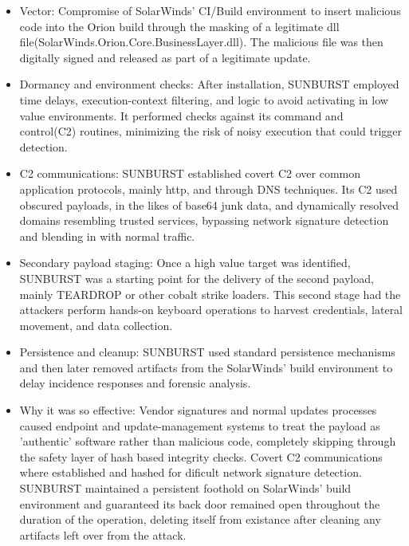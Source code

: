 \documentclass[conference]{IEEEtran}
\begin{document}
\begin{itemize}
    \item Vector: Compromise of SolarWinds' CI/Build environment to insert malicious code into the Orion build through the masking of a legitimate dll file(SolarWinds.Orion.Core.BusinessLayer.dll).
    The malicious file was then digitally signed and released as part of a legitimate update.\cite{MicrosoftDeepDiveSOLORIGATE}\\
    \item Dormancy and environment checks: After installation, SUNBURST employed time delays, execution-context filtering, and logic to avoid activating in low value environments.
    It performed checks against its command and control(C2) routines, minimizing the risk of noisy execution that could trigger detection.\cite{MicrosoftDeepDiveSOLORIGATE}\\
    \item C2 communications: SUNBURST established covert C2 over common application protocols, mainly http, and through DNS techniques. Its C2 used obscured payloads, in the likes
    of base64 junk data, and dynamically resolved domains resembling trusted services, bypassing network signature detection and blending in with normal traffic.\cite{MicrosoftDeepDiveSOLORIGATE}\\
    \item Secondary payload staging: Once a high value target was identified, SUNBURST was a starting point for the delivery of the second payload, mainly TEARDROP or other cobalt strike loaders.
    This second stage had the attackers perform hands-on keyboard operations to harvest credentials, lateral movement, and data collection.\cite{MicrosoftDeepDiveSOLORIGATE}\\
    \item Persistence and cleanup: SUNBURST used standard persistence mechanisms and then later removed artifacts from the SolarWinds' build environment to delay incidence responses
    and forensic analysis.\cite{MicrosoftDeepDiveSOLORIGATE}\\
    \item Why it was so effective: Vendor signatures and normal updates processes caused endpoint and update-management systems to treat the payload as 'authentic' software
    rather than malicious code, completely skipping through the safety layer of hash based integrity checks. Covert C2 communications where established and hashed for dificult network signature detection.
    SUNBURST maintained a persistent foothold on SolarWinds' build environment and guaranteed its back door remained open throughout the duration of the operation, deleting itself from existance after cleaning 
    any artifacts left over from the attack.
\end{itemize}
\end{document}
